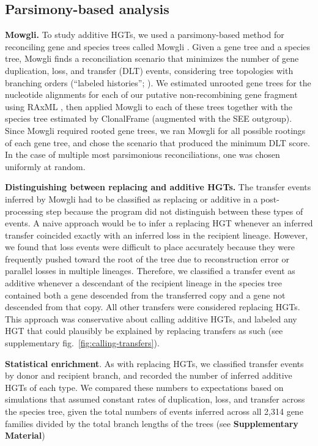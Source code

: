 \documentclass[12pt]{article}
\begin{document}
\subsection*{Parsimony-based analysis}


{\bf Mowgli.} To study additive HGTs, we used a parsimony-based method
for reconciling gene and species trees called Mowgli \citep{Doyon2011}.
Given a gene tree and a species tree, Mowgli finds a reconciliation scenario 
that minimizes the number of gene duplication, loss, and
transfer (DLT) events, considering tree topologies with branching orders
(``labeled histories''; \citealp{Edwards1970}).  We estimated
unrooted gene trees for the nucleotide alignments for each of our
putative non-recombining gene fragment using RAxML \citep{Stamatakis2006},
then applied Mowgli to each of these trees together with the species
tree estimated by ClonalFrame (augmented with the SEE outgroup).
Since Mowgli required rooted gene trees, we ran Mowgli for all possible
rootings of each gene tree, and chose the scenario that produced the
minimum DLT score. In the case of multiple most parsimonious
reconciliations, one was chosen uniformly at random.

{\bf Distinguishing between replacing and additive HGTs.}  The transfer
events inferred by Mowgli had to be classified as replacing or additive in
a post-processing step because the program did not distinguish between
these types of events.  A naive approach would be to infer a replacing HGT
whenever an inferred transfer coincided exactly with an inferred loss in
the recipient lineage.  However, we found that loss events were difficult
to place accurately because they were frequently pushed toward the root of
the tree due to reconstruction error or parallel losses in multiple
lineages.  Therefore, we classified a transfer event as additive whenever a
descendant of the recipient lineage in the species tree contained both a
gene descended from the transferred copy and a gene not descended from that
copy.  All other transfers were considered replacing HGTs.  This approach
was conservative about calling additive HGTs, and labeled any HGT that
could plausibly be explained by replacing transfers as such (see
supplementary fig.\ \ref{fig:calling-transfers}).

{\bf Statistical enrichment}. As with replacing HGTs, we classified
transfer events by donor and recipient branch, and recorded the number of
inferred additive HGTs of each type.  We compared these numbers to
expectations based on simulations that assumed constant rates of
duplication, loss, and transfer across the species tree, given the total
numbers of events inferred across all 2,314 gene families divided by the
total branch lengths of the trees (see \textbf{Supplementary Material})
\end{document}
